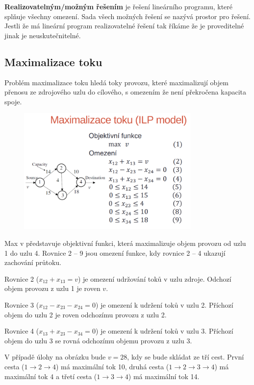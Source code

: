 \textbf{Realizovatelným/možným řešením} je řešení lineárního programu, které splňuje všechny omezení. Sada všech možných řešení se nazývá prostor pro řešení. Jestli že má lineární program realizovatelné řešení tak říkáme že je proveditelné jinak je neuskutečnitelné.

\subsection{Maximalizace toku}
Problém maximalizace toku hledá toky provozu, které maximalizují objem přenosu ze zdrojového uzlu do cílového, s omezením že není překročena kapacita spoje.

\begin{figure} [h]
    \centering
    \includegraphics[width=0.8\textwidth]{snimky/ilpModel.png}
\end{figure}

Max v představuje objektivní funkci, která maximalizuje objem provozu od uzlu 1 do uzlu 4. Rovnice 2 -- 9 jsou omezení funkce, kdy rovnice 2 -- 4 ukazují zachování průtoku.

Rovnice 2 ($x_{12} + x_{13} = v$) je omezení udržování toků v uzlu zdroje. Odchozí objem provozu z uzlu 1 je roven $v$.

Rovnice 3 ($x_{12} - x_{23} - x_{24} = 0$) je omezení k udržení toků v uzlu 2. Příchozí objem do uzlu 2 je roven odchozímu provozu z uzlu 2.

Rovnice 4 ($x_{13} + x_{23} - x_{34} = 0$) je omezení k udržení toků v uzlu 3. Příchozí objem do uzlu 3 se rovná odchozímu objemu provozu z uzlu 3.

V případě úlohy na obrázku bude $v = 28$, kdy se bude skládat ze tří cest. První cesta ($1\xrightarrow{}2\xrightarrow{}4$) má maximální tok 10, druhá cesta ($1\xrightarrow{}2\xrightarrow{}3\xrightarrow{}4$) má maximální tok 4 a třetí cesta ($1\xrightarrow{}3\xrightarrow{}4$) má maximální tok 14.

